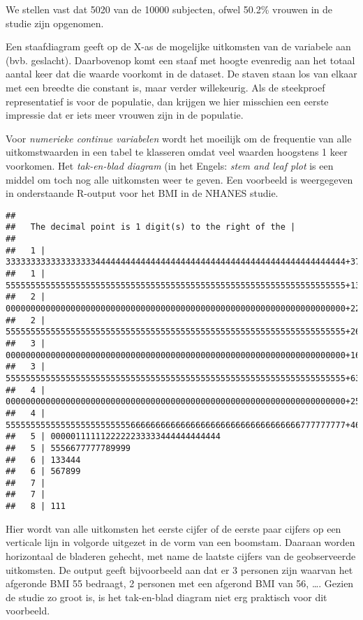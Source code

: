 \documentclass[
  12pt,dutch,coursenotes]{book}
\newenvironment{Shaded}{\begin{snugshade}}{\end{snugshade}}
\newcommand{\KeywordTok}[1]{\textcolor[rgb]{0.13,0.29,0.53}{\textbf{#1}}}
\newcommand{\NormalTok}[1]{#1}
\newcommand{\OperatorTok}[1]{\textcolor[rgb]{0.81,0.36,0.00}{\textbf{#1}}}
\theoremstyle{definition}
\theoremstyle{definition}
\theoremstyle{definition}
\theoremstyle{remark}
\begin{document}
We stellen vast dat 5020 van de 10000 subjecten, ofwel 50.2\% vrouwen in de studie zijn opgenomen.

Een staafdiagram geeft op de X-as de mogelijke uitkomsten van de variabele
aan (bvb. geslacht). Daarbovenop komt een staaf met hoogte evenredig aan
het totaal aantal keer dat die waarde voorkomt in de dataset. De staven staan los van elkaar met een breedte die constant is, maar verder willekeurig. Als de steekproef
representatief is voor de populatie, dan
krijgen we hier misschien een eerste impressie dat er iets meer vrouwen zijn in de populatie.

Voor \emph{numerieke continue variabelen} wordt het moeilijk om de
frequentie van alle uitkomstwaarden in een tabel te klasseren omdat veel
waarden hoogstens 1 keer voorkomen. Het \emph{tak-en-blad diagram} (in het
Engels: \emph{stem and leaf plot} is een middel om toch nog alle
uitkomsten weer te geven. Een voorbeeld is weergegeven in onderstaande R-output voor het BMI in de NHANES studie.

\begin{Shaded}
\end{Shaded}

\begin{verbatim}
## 
##   The decimal point is 1 digit(s) to the right of the |
## 
##   1 | 33333333333333333344444444444444444444444444444444444444444444444444+37
##   1 | 55555555555555555555555555555555555555555555555555555555555555555555+1389
##   2 | 00000000000000000000000000000000000000000000000000000000000000000000+2264
##   2 | 55555555555555555555555555555555555555555555555555555555555555555555+2610
##   3 | 00000000000000000000000000000000000000000000000000000000000000000000+1693
##   3 | 55555555555555555555555555555555555555555555555555555555555555555555+635
##   4 | 00000000000000000000000000000000000000000000000000000000000000000000+255
##   4 | 55555555555555555555555556666666666666666666666666666666666777777777+46
##   5 | 0000011111122222233333444444444444
##   5 | 5556677777789999
##   6 | 133444
##   6 | 567899
##   7 | 
##   7 | 
##   8 | 111
\end{verbatim}

Hier wordt van alle uitkomsten het eerste cijfer of de eerste paar cijfers
op een verticale lijn in volgorde uitgezet in de vorm van een boomstam.
Daaraan worden horizontaal de bladeren gehecht, met name de laatste cijfers
van de geobserveerde uitkomsten. De output geeft bijvoorbeeld aan dat er 3 personen zijn waarvan het afgeronde BMI 55 bedraagt, 2 personen met een afgerond BMI van 56, \ldots.
Gezien de studie zo groot is, is het tak-en-blad diagram niet erg praktisch voor dit voorbeeld.
\end{document}
